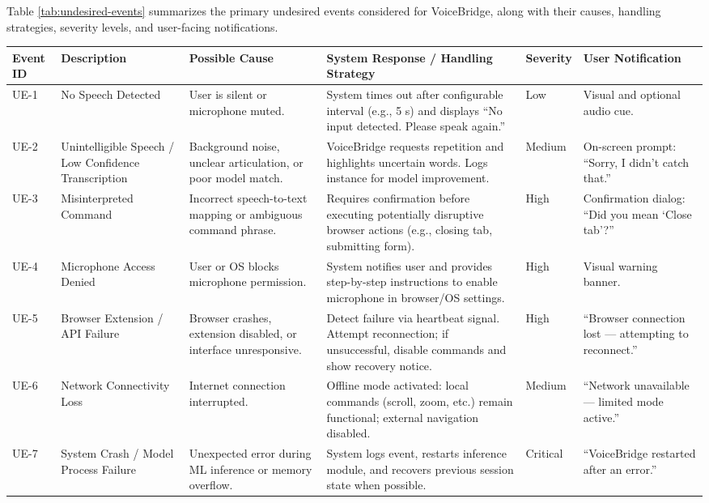\documentclass[11pt]{article}
\begin{document}
Table \ref{tab:undesired-events} summarizes the primary undesired events considered for VoiceBridge, along with their causes, handling strategies, severity levels, and user-facing notifications.

\begin{table}[H]
\centering
\footnotesize
\begin{tabularx}{\textwidth}{p{1cm} p{2cm} X X p{1cm} p{2cm}}
\toprule
\textbf{Event ID} & \textbf{Description} & \textbf{Possible Cause} & \textbf{System Response / Handling Strategy} & \textbf{Severity} & \textbf{User Notification} \\
\midrule
UE-1 & No Speech Detected & User is silent or microphone muted. & System times out after configurable interval (e.g., 5 s) and displays “No input detected. Please speak again.” & Low & Visual and optional audio cue. \\
\hline
UE-2 & Unintelligible Speech / Low Confidence Transcription & Background noise, unclear articulation, or poor model match. & VoiceBridge requests repetition and highlights uncertain words. Logs instance for model improvement. & Medium & On-screen prompt: “Sorry, I didn’t catch that.” \\
\hline
UE-3 & Misinterpreted Command & Incorrect speech-to-text mapping or ambiguous command phrase. & Requires confirmation before executing potentially disruptive browser actions (e.g., closing tab, submitting form). & High & Confirmation dialog: “Did you mean ‘Close tab’?” \\
\hline
UE-4 & Microphone Access Denied & User or OS blocks microphone permission. & System notifies user and provides step-by-step instructions to enable microphone in browser/OS settings. & High & Visual warning banner. \\
\hline
UE-5 & Browser Extension / API Failure & Browser crashes, extension disabled, or interface unresponsive. & Detect failure via heartbeat signal. Attempt reconnection; if unsuccessful, disable commands and show recovery notice. & High & “Browser connection lost — attempting to reconnect.” \\
\hline
UE-6 & Network Connectivity Loss & Internet connection interrupted. & Offline mode activated: local commands (scroll, zoom, etc.) remain functional; external navigation disabled. & Medium & “Network unavailable — limited mode active.” \\
\hline
UE-7 & System Crash / Model Process Failure & Unexpected error during ML inference or memory overflow. & System logs event, restarts inference module, and recovers previous session state when possible. & Critical & “VoiceBridge restarted after an error.” \\

\end{tabularx}
\end{table}
\end{document}
